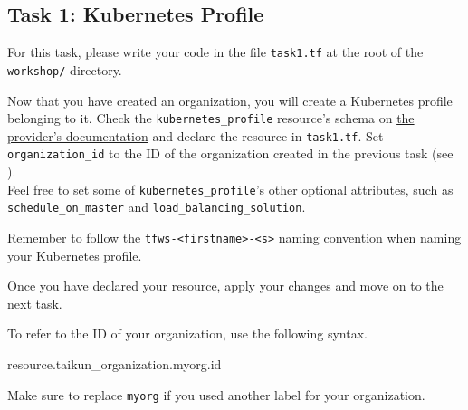 \subsection{Task 1: Kubernetes Profile}\label{sec:task1}

\begin{note}
For this task, please write your code in the file \texttt{task1.tf}
at the root of the \texttt{workshop/} directory.
\end{note}

Now that you have created an organization,
you will create a Kubernetes profile belonging to it.
Check the \texttt{kubernetes\_profile} resource's schema on
\href{https://registry.terraform.io/providers/itera-io/taikun/latest/docs/resources/kubernetes_profile}{the provider's documentation}
and declare the resource in \texttt{task1.tf}.
Set \texttt{organization\_id} to the ID
of the organization created in the previous task (see ).\\

Feel free to set some of \texttt{kubernetes\_profile}'s other optional attributes,
such as \texttt{schedule\_on\_master} and \texttt{load\_balancing\_solution}.

\begin{warn}
  Remember to follow the \texttt{tfws-<firstname>-<s>} naming convention when naming your Kubernetes profile.
\end{warn}

Once you have declared your resource, apply your changes and move on to the next task.

\begin{tip}
To refer to the ID of your organization, use the following syntax.
\begin{tf}
resource.taikun_organization.myorg.id
\end{tf}
Make sure to replace \texttt{myorg} if you used another label for your organization.
\end{tip}

